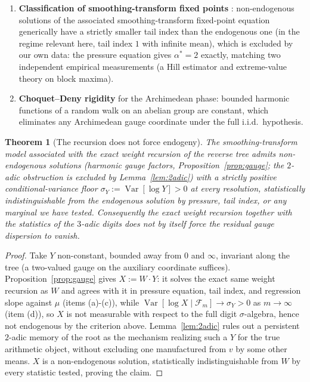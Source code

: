\documentclass[11pt]{article}
\newtheorem{theorem}{Theorem}[section]
\theoremstyle{definition}
\theoremstyle{remark}
\DeclareMathOperator{\Var}{Var}
\begin{document}
\begin{enumerate}[label=(\alph*)]
\item \textbf{Classification of smoothing-transform fixed points}
  \cite{DurrettLiggett1983,AlsmeyerBigginsMeiners2012}: non-endogenous
  solutions of the associated smoothing-transform fixed-point equation
  generically have a strictly smaller tail index than the endogenous
  one (in the regime relevant here, tail index $1$ with infinite mean),
  which is excluded by our own data: the pressure equation gives
  $\alpha^\ast=2$ exactly, matching two independent empirical
  measurements (a Hill estimator and extreme-value theory on block
  maxima).
\item \textbf{Choquet--Deny rigidity} for the Archimedean phase:
  bounded harmonic functions of a random walk on an abelian group are
  constant, which eliminates any Archimedean gauge coordinate under
  the full i.i.d.\ hypothesis.
\end{enumerate}

\begin{theorem}[The recursion does not force endogeny]\label{thm:barrier}
The smoothing-transform model associated with the exact weight
recursion of the reverse tree admits non-endogenous solutions (harmonic
gauge factors, Proposition~\ref{prop:gauge}; the $2$-adic obstruction is
excluded by Lemma~\ref{lem:2adic}) with a strictly positive
conditional-variance floor $\sigma_Y:=\Var[\log Y]>0$ at every
resolution, statistically indistinguishable from the endogenous solution by
pressure, tail index, or any marginal we have tested. Consequently the
exact weight recursion together with the statistics of the $3$-adic
digits does not by itself force the residual gauge dispersion to
vanish.
\end{theorem}

\begin{proof}
Take $Y$ non-constant, bounded away from $0$ and $\infty$, invariant
along the tree (a two-valued gauge on the auxiliary coordinate
suffices). Proposition~\ref{prop:gauge} gives $X:=W\cdot Y$: it solves
the exact same weight recursion as $W$ and agrees with it in pressure
equation, tail index, and regression slope against $\mu$ (items
(a)-(c)), while $\Var[\log X\mid\mathcal{F}_m]\to\sigma_Y>0$ as
$m\to\infty$ (item (d)), so $X$ is not measurable with respect to the
full digit $\sigma$-algebra, hence not endogenous by the criterion
above. Lemma~\ref{lem:2adic} rules out a persistent $2$-adic memory of
the root as the mechanism realizing such a $Y$ for the true arithmetic
object, without excluding one manufactured from $v$ by some other
means. $X$ is a non-endogenous solution, statistically
indistinguishable from $W$ by every statistic tested, proving the
claim.
\end{proof}
\end{document}
